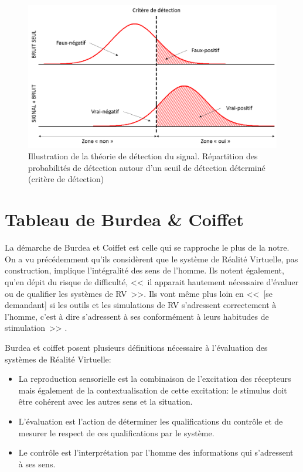		\begin{figure}
			\centering
			\includegraphics[scale=.5]{Figures/SignalDetectionTheory}
			\caption{Illustration de la théorie de détection du signal. Répartition des probabilités de détection autour d'un seuil de détection déterminé (critère de détection)}
			\label{fig:signal_detection_theory}
		\end{figure}
		
		\section{Tableau de Burdea \& Coiffet}
		\par La démarche de Burdea et Coiffet est celle qui se rapproche le plus de la notre. On a vu précédemment qu'ils considèrent que le système de Réalité Virtuelle, pas construction, implique l'intégralité des sens de l'homme. Ils notent également, qu'en dépit du risque de difficulté, <<~il apparait hautement nécessaire d'évaluer ou de qualifier les systèmes de RV~>>. Ils vont même plus loin en <<~[se demandant] si les outils et les simulations de RV s'adressent correctement à l'homme, c'est à dire s'adressent à ses conformément à leurs habitudes de stimulation~>> \citep{burdea_realite_1993}.
		
		\par Burdea et coiffet posent plusieurs définitions nécessaire à l'évaluation des systèmes de Réalité Virtuelle:
		\begin{itemize}
			\item La reproduction sensorielle est la combinaison de l'excitation des récepteurs mais également de la contextualisation de cette excitation: le stimulus doit être cohérent avec les autres sens et la situation.
			\item L'évaluation est l'action de déterminer les qualifications du contrôle et de mesurer le respect de ces qualifications par le système.
			\item Le contrôle est l'interprétation par l'homme des informations qui s'adressent à ses sens.
		\end{itemize}
		
